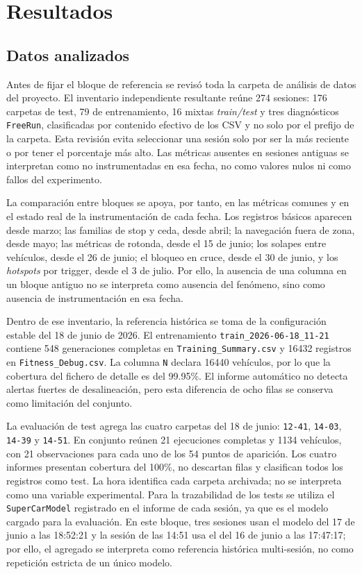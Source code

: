 \chapter{Resultados}

\section{Datos analizados}

Antes de fijar el bloque de referencia se revisó toda la carpeta de análisis de datos del proyecto. El inventario independiente resultante reúne 274 sesiones: 176 carpetas de test, 79 de entrenamiento, 16 mixtas \textit{train/test} y tres diagnósticos \texttt{FreeRun}, clasificadas por contenido efectivo de los CSV y no solo por el prefijo de la carpeta. Esta revisión evita seleccionar una sesión solo por ser la más reciente o por tener el porcentaje más alto. Las métricas ausentes en sesiones antiguas se interpretan como no instrumentadas en esa fecha, no como valores nulos ni como fallos del experimento.

La comparación entre bloques se apoya, por tanto, en las métricas comunes y en el estado real de la instrumentación de cada fecha. Los registros básicos aparecen desde marzo; las familias de stop y ceda, desde abril; la navegación fuera de zona, desde mayo; las métricas de rotonda, desde el 15 de junio; los solapes entre vehículos, desde el 26 de junio; el bloqueo en cruce, desde el 30 de junio, y los \textit{hotspots} por trigger, desde el 3 de julio. Por ello, la ausencia de una columna en un bloque antiguo no se interpreta como ausencia del fenómeno, sino como ausencia de instrumentación en esa fecha.

Dentro de ese inventario, la referencia histórica se toma de la configuración estable del 18 de junio de 2026. El entrenamiento \texttt{train\_2026-06-18\_11-21} contiene 548 generaciones completas en \texttt{Training\_Summary.csv} y 16432 registros en \texttt{Fitness\_Debug.csv}. La columna \texttt{N} declara 16440 vehículos, por lo que la cobertura del fichero de detalle es del 99.95\%. El informe automático no detecta alertas fuertes de desalineación, pero esta diferencia de ocho filas se conserva como limitación del conjunto.

La evaluación de test agrega las cuatro carpetas del 18 de junio: \texttt{12-41}, \texttt{14-03}, \texttt{14-39} y \texttt{14-51}. En conjunto reúnen 21 ejecuciones completas y 1134 vehículos, con 21 observaciones para cada uno de los 54 puntos de aparición. Los cuatro informes presentan cobertura del 100\%, no descartan filas y clasifican todos los registros como test. La hora identifica cada carpeta archivada; no se interpreta como una variable experimental. Para la trazabilidad de los tests se utiliza el \texttt{SuperCarModel} registrado en el informe de cada sesión, ya que es el modelo cargado para la evaluación. En este bloque, tres sesiones usan el modelo del 17 de junio a las 18:52:21 y la sesión de las 14:51 usa el del 16 de junio a las 17:47:17; por ello, el agregado se interpreta como referencia histórica multi-sesión, no como repetición estricta de un único modelo.

